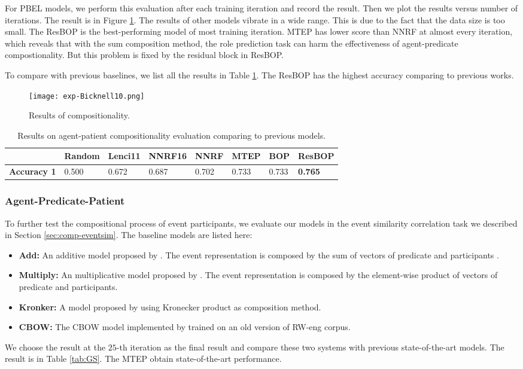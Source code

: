 \documentclass[a4paper]{article}
\begin{document}
For PBEL models, we perform this evaluation after each training iteration and record the result. Then we plot the results versus number of iterations. The result is in Figure \ref{fig:exp-Bicknell10}. The results of other models vibrate in a wide range. This is due to the fact that the data size is too small. The ResBOP is the best-performing model of most training iteration. MTEP has lower score than NNRF at almost every iteration, which reveals that with the sum composition method, the role prediction task can harm the effectiveness of agent-predicate compostionality. But this problem is fixed by the residual block in ResBOP. 

To compare with previous baselines, we list all the results in Table \ref{tab:Bicknell10}. The ResBOP has the highest accuracy comparing to previous works. 

\begin{figure}[t]
\centering
\texttt{[image: exp-Bicknell10.png]}
\caption{\label{fig:exp-Bicknell10} Results of compositionality.}
\end{figure}

\begin{table}
\centering
\begin{tabular}{l|lll|llll}
      & Random & Lenci11 & NNRF16 & NNRF & MTEP &   BOP    &   ResBOP     \\ \hline
\textbf{Accuracy 1} & 0.500  & 0.672   & 0.687  & 0.702& 0.733&   0.733  & \textbf{0.765} \\
\end{tabular}
\caption{\label{tab:Bicknell10} Results on agent-patient compositionality evaluation comparing to previous models.}
\end{table}


\subsubsection{Agent-Predicate-Patient} \label{sec:result-eventsim}
To further test the compositional process of event participants, we evaluate our models in the event similarity correlation task we described in Section \ref{sec:comp-eventsim}. The baseline models are listed here: 
\begin{itemize}
  \item \textbf{Add: } An additive model proposed by \citet{mitchell2008vector}. The event representation is composed by the sum of vectors of predicate and participants . 
  \item \textbf{Multiply: } An multiplicative model proposed by \citet{mitchell2008vector}. The event representation is composed by the element-wise product of vectors of predicate and participants. 
  \item \textbf{Kronker: }  A model proposed by \citet{grefenstette2015concrete} using Kronecker product as composition method. 
  \item \textbf{CBOW: }   The CBOW model implemented by \citet{tilk2016event} trained on an old version of RW-eng corpus.
\end{itemize}
We choose the result at the $25$-th iteration as the final result and compare these two systems with previous state-of-the-art models. The result is in Table \ref{tab:GS}. The MTEP obtain state-of-the-art performance. 
\end{document}
